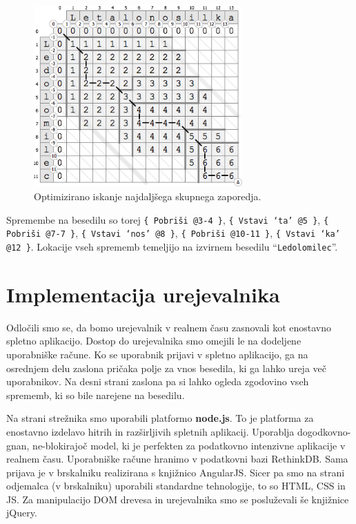 \documentclass[a4paper, 12pt, twoside]{book}
\begin{document}
\begin{figure}[placement h]
\begin{center}
\includegraphics[width=8cm]{ses9.png}
\end{center}
\caption{Optimizirano iskanje najdaljšega skupnega zaporedja.}
\label{ses9}
\end{figure}

Spremembe na besedilu so torej {\tt \{ Pobriši @3-4 \}}, {\tt \{ Vstavi ‘ta’ @5 \}}, {\tt \{ Pobriši @7-7 \}}, {\tt \{ Vstavi ‘nos’ @8 \}}, {\tt \{ Pobriši @10-11 \}}, {\tt \{ Vstavi ‘ka’ @12 \}}. Lokacije vseh sprememb temeljijo na izvirnem besedilu “{\tt Ledolomilec}”.

\chapter{Implementacija urejevalnika}

Odločili smo se, da bomo urejevalnik v realnem času zasnovali kot enostavno spletno aplikacijo. Dostop do urejevalnika smo omejili le na dodeljene uporabniške račune. Ko se uporabnik prijavi v spletno aplikacijo, ga na osrednjem delu zaslona pričaka polje za vnos besedila, ki ga lahko ureja več uporabnikov. Na desni strani zaslona pa si lahko ogleda zgodovino vseh sprememb, ki so bile narejene na besedilu.

Na strani strežnika smo uporabili platformo \textbf{node.js}. To je platforma za enostavno izdelavo hitrih in razširljivih spletnih aplikacij. Uporablja dogodkovno-gnan, ne-blokirajoč model, ki je perfekten za podatkovno intenzivne aplikacije v realnem času. Uporabniške račune hranimo v podatkovni bazi RethinkDB. Sama prijava je v brskalniku realizirana s knjižnico AngularJS. Sicer pa smo na strani odjemalca (v brskalniku) uporabili standardne tehnologije, to so HTML, CSS in JS. Za manipulacijo DOM drevesa in urejevalnika smo se posluževali še knjižnice jQuery.
\end{document}
